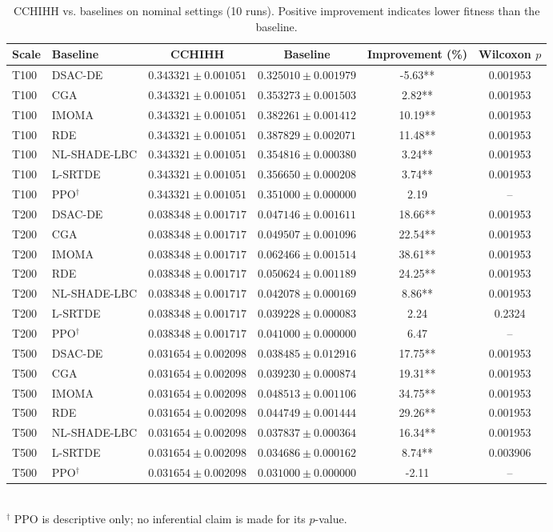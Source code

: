 \begin{table}[t]
\centering
\caption{CCHIHH vs. baselines on nominal settings (10 runs). Positive improvement indicates lower fitness than the baseline.}
\begin{tabular}{llcccc}
\toprule
Scale & Baseline & CCHIHH & Baseline & Improvement (\%) & Wilcoxon $p$ \\
\midrule
T100 & DSAC-DE & $0.343321 \pm 0.001051$ & $0.325010 \pm 0.001979$ & -5.63** & 0.001953 \\
T100 & CGA & $0.343321 \pm 0.001051$ & $0.353273 \pm 0.001503$ & 2.82** & 0.001953 \\
T100 & IMOMA & $0.343321 \pm 0.001051$ & $0.382261 \pm 0.001412$ & 10.19** & 0.001953 \\
T100 & RDE & $0.343321 \pm 0.001051$ & $0.387829 \pm 0.002071$ & 11.48** & 0.001953 \\
T100 & NL-SHADE-LBC & $0.343321 \pm 0.001051$ & $0.354816 \pm 0.000380$ & 3.24** & 0.001953 \\
T100 & L-SRTDE & $0.343321 \pm 0.001051$ & $0.356650 \pm 0.000208$ & 3.74** & 0.001953 \\
T100 & PPO$^\dagger$ & $0.343321 \pm 0.001051$ & $0.351000 \pm 0.000000$ & 2.19 & -- \\
\midrule
T200 & DSAC-DE & $0.038348 \pm 0.001717$ & $0.047146 \pm 0.001611$ & 18.66** & 0.001953 \\
T200 & CGA & $0.038348 \pm 0.001717$ & $0.049507 \pm 0.001096$ & 22.54** & 0.001953 \\
T200 & IMOMA & $0.038348 \pm 0.001717$ & $0.062466 \pm 0.001514$ & 38.61** & 0.001953 \\
T200 & RDE & $0.038348 \pm 0.001717$ & $0.050624 \pm 0.001189$ & 24.25** & 0.001953 \\
T200 & NL-SHADE-LBC & $0.038348 \pm 0.001717$ & $0.042078 \pm 0.000169$ & 8.86** & 0.001953 \\
T200 & L-SRTDE & $0.038348 \pm 0.001717$ & $0.039228 \pm 0.000083$ & 2.24 & 0.2324 \\
T200 & PPO$^\dagger$ & $0.038348 \pm 0.001717$ & $0.041000 \pm 0.000000$ & 6.47 & -- \\
\midrule
T500 & DSAC-DE & $0.031654 \pm 0.002098$ & $0.038485 \pm 0.012916$ & 17.75** & 0.001953 \\
T500 & CGA & $0.031654 \pm 0.002098$ & $0.039230 \pm 0.000874$ & 19.31** & 0.001953 \\
T500 & IMOMA & $0.031654 \pm 0.002098$ & $0.048513 \pm 0.001106$ & 34.75** & 0.001953 \\
T500 & RDE & $0.031654 \pm 0.002098$ & $0.044749 \pm 0.001444$ & 29.26** & 0.001953 \\
T500 & NL-SHADE-LBC & $0.031654 \pm 0.002098$ & $0.037837 \pm 0.000364$ & 16.34** & 0.001953 \\
T500 & L-SRTDE & $0.031654 \pm 0.002098$ & $0.034686 \pm 0.000162$ & 8.74** & 0.003906 \\
T500 & PPO$^\dagger$ & $0.031654 \pm 0.002098$ & $0.031000 \pm 0.000000$ & -2.11 & -- \\
\bottomrule
\end{tabular}
\\
\footnotesize{$^\dagger$ PPO is descriptive only; no inferential claim is made for its $p$-value.}
\end{table}
